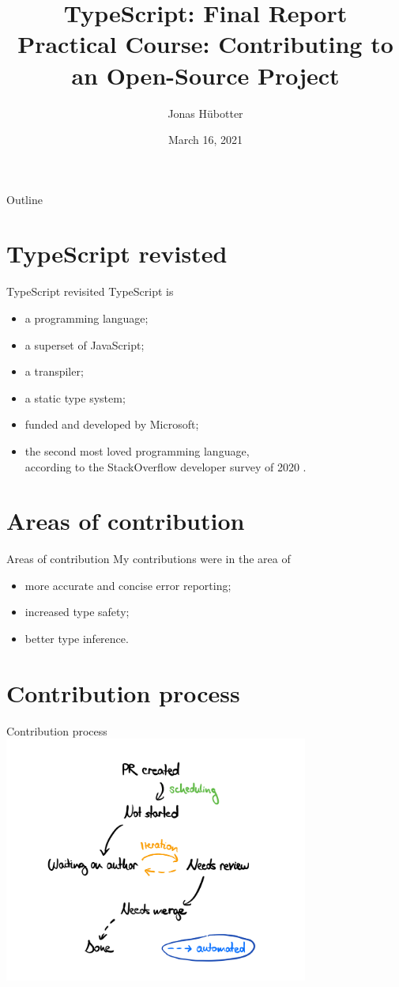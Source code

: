 \documentclass{beamer}
\title{TypeScript: Final Report \\[0.1cm] \small{Practical Course: Contributing to an Open-Source Project}}
\author{Jonas Hübotter}
\date{March 16, 2021}
\theoremstyle{definition}
\begin{document}
\begin{frame}
  \titlepage
\end{frame}

\begin{frame}{Outline}
 \tableofcontents
\end{frame}

\section{TypeScript revisted}
\begin{frame}{TypeScript revisited}
TypeScript is
\begin{itemize}
    \item a programming language\pause;
    \item a superset of JavaScript\pause;
    \item a transpiler\pause;
    \item a static type system\pause;
    \item funded and developed by Microsoft\pause;
    \item the second most loved programming language, \\ according to the StackOverflow developer survey of 2020 \cite{StackOverflow2020}.
\end{itemize}
\end{frame}

\section{Areas of contribution}
\begin{frame}{Areas of contribution}
My contributions were in the area of
\begin{itemize}
    \item more accurate and concise error reporting;
    \item increased type safety;
    \item better type inference.
\end{itemize}
\end{frame}

\section{Contribution process}
\begin{frame}{Contribution process}
\centering
\includegraphics[width=10cm]{images/pr_backlog.png}
\end{frame}
\end{document}
